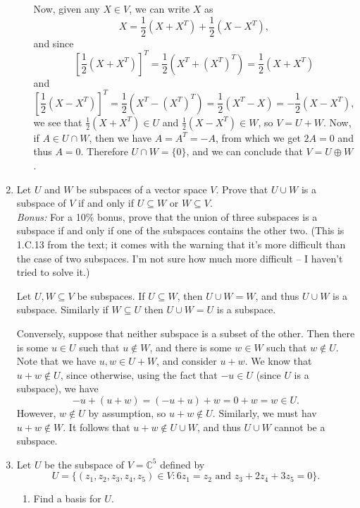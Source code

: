 \documentclass[letterpaper,12pt]{article}
\newcommand{\C}{\mathbb{C}}
\begin{document}
\begin{enumerate}
\begin{enumerate}
 Now, given any $X\in V$, we can write $X$ as
 \[
 X = \frac{1}{2}(X+X^T)+\frac{1}{2}(X-X^T),
 \]
 and since 
 \[
 [\frac{1}{2}(X+X^T)]^T = \frac{1}{2}(X^T+(X^T)^T) = \frac{1}{2}(X+X^T)
 \]
 and
 \[
 [\frac{1}{2}(X-X^T)]^T = \frac{1}{2}(X^T-(X^T)^T) = \frac{1}{2}(X^T-X)=-\frac{1}{2}(X-X^T),
 \]
 we see that $\frac{1}{2}(X+X^T)\in U$ and $\frac{1}{2}(X-X^T)\in W$, so $V=U+W$. Now, if $A\in U\cap W$, then we have
 $A = A^T = -A$, from which we get $2A=0$ and thus $A=0$. Therefore $U\cap W=\{0\}$, and we can conclude that $V=U\oplus W$.
 \end{enumerate}
 
 \bigskip
 
 \item Let $U$ and $W$ be subspaces of a vector space $V$. Prove that $U\cup W$ is a subspace of $V$ if and only if $U\subseteq W$ or $W\subseteq V$.\\
 {\em Bonus:} For a 10\% bonus, prove that the union of three subspaces is a subspace if and only if one of the subspaces contains the other two. (This is 1.C.13 from the text; it comes with the warning that it's more difficult than the case of two subspaces. I'm not sure how much more difficult -- I haven't tried to solve it.)
 
 \bigskip
 
 Let $U,W\subseteq V$ be subspaces. If $U\subseteq W$, then $U\cup W = W$, and thus $U\cup W$ is a subspace. Similarly if $W\subseteq U$ then $U\cup W = U$ is a subspace.
 
 Conversely, suppose that neither subspace is a subset of the other. Then there is some $u\in U$ such that $u\notin W$, and there is some $w\in W$ such that $w\notin U$. Note that we have $u,w\in U+W$, and consider $u+w$. We know that $u+w\notin U$, since otherwise, using the fact that $-u\in U$ (since $U$ is a subspace), we have
 \[
 -u+(u+w) = (-u+u)+w=0+w=w\in U.
 \]
 However, $w\notin U$ by assumption, so $u+w\notin U$. Similarly, we must hav $u+w\notin W$. It follows that $u+w\notin U\cup W$, and thus $U\cup W$ cannot be a subspace.
 
 \bigskip
 

 \item Let $U$ be the subspace of $V=\C^5$ defined by
 \[
 U = \{(z_1,z_2,z_3,z_4,z_5)\in V : 6z_1=z_2 \text{ and } z_3+2z_4+3z_5=0\}.
 \]
 \begin{enumerate}
 \item Find a basis for $U$.
 
 \bigskip
 

\end{enumerate}
\end{enumerate}
\end{document}
